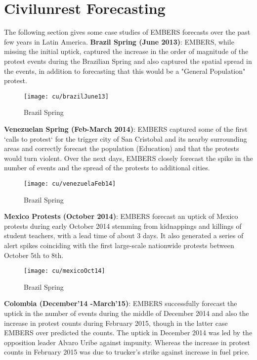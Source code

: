 \section{Civilunrest Forecasting}
The following section gives some case studies of EMBERS forecasts over
the past few years in Latin America.
\textbf{Brazil Spring (June 2013)}:
EMBERS, while missing the initial uptick, captured the increase in the order of
magnitude of the protest events during the Brazilian Spring and also captured
the spatial spread in the events, in addition to forecasting that this would be
a "General Population" protest.
\begin{figure}[H]
\texttt{[image: cu/brazilJune13]}
\caption{Brazil Spring}
\label{fig:brazilJune13}
\end{figure}


\textbf{Venezuelan Spring (Feb-March 2014)}:
EMBERS captured some of the first `calls to protest` for the trigger city of
San Cristobal and its nearby surrounding areas and correctly forecast the
population (Education) and that the protests would turn violent. Over the next
days, EMBERS closely forecast the spike in the number of events and the spread
of the protests to additional cities.
   
\begin{figure}[H]
\texttt{[image: cu/venezuelaFeb14]}
\caption{Brazil Spring}
\label{fig:venezuelaMarch14}
\end{figure}

\textbf{Mexico Protests (October 2014)}:
EMBERS forecast an uptick of Mexico protests during early October 2014 stemming
from kidnappings and killings of student teachers, with a lead time of about 3
days. It also generated  a series of alert spikes coinciding with the first
large-scale nationwide protests between October 5th to 8th.
\begin{figure}[H]
\texttt{[image: cu/mexicoOct14]}
\caption{Brazil Spring}
\label{fig:mexicoOct14}
\end{figure}

\textbf{Colombia (December'14 -March'15)}:
EMBERS successfully forecast the uptick in the number of events during the
middle of December 2014 and also the increase in protest counts during February
2015, though in the latter case EMBERS over predicted the counts. The uptick in
December 2014 was led by the opposition leader Alvaro Uribe against impunity.
Whereas the increase in  protest counts in February 2015
was due to trucker’s strike against increase in fuel price.

